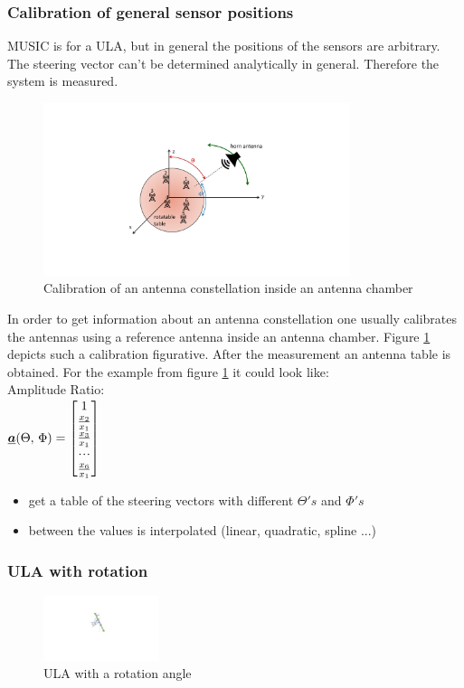\subsubsection{Calibration of general sensor positions }
MUSIC is for a ULA, but in general the positions of the sensors are arbitrary. The steering vector can't be determined analytically in general. Therefore the system is measured. 
\begin{figure}[H]
	\centering
		\includegraphics[trim =5cm 3cm 5cm 3cm, clip, width=0.80\textwidth]{graphics/Calibration_scenario.pdf}
	\caption{Calibration of an antenna constellation inside an antenna chamber}
	\label{fig:Calibration_scenario}
\end{figure}

In order to get information about an antenna constellation one usually calibrates the antennas using a reference antenna inside an antenna chamber. Figure \ref{fig:Calibration_scenario} depicts such a calibration figurative. After the measurement an antenna table is obtained. For the example from figure \ref{fig:Calibration_scenario} it could look like:\\
Amplitude Ratio:\\
$\underline{\boldsymbol {a}}(\Theta,\,\Phi)=\begin{bmatrix} 1\\\frac{x_2}{x_1}\\\frac{x_3}{x_1}\\\!\cdot \!\cdot\!\cdot\!\\\frac{x_6}{x_1} \end{bmatrix}$

\begin{itemize}
\item get a table of the steering vectors with different $\Theta's$ and $\Phi's$
\item between the values is interpolated (linear, quadratic, spline ...)
\end{itemize}

\subsubsection{ULA with rotation}
\begin{figure}[H]
	\centering
		\includegraphics[trim =14cm 8cm 15.5cm 4.7cm, clip, width=0.30\textwidth]{graphics/ULA_angle.pdf}
	\caption{ULA with a rotation angle}
	\label{fig:ULA_angle}
\end{figure}


